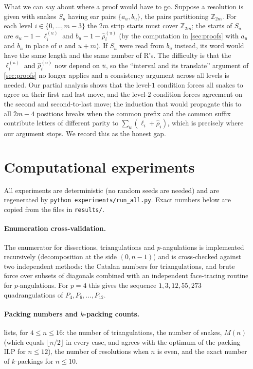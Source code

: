 \documentclass[11pt,a4paper]{article}
\theoremstyle{definition}
\theoremstyle{remark}
\newcommand{\Zd}{\ensuremath{\mathbb{Z}}}
\newcommand{\Ri}{\mathrm{R}}
\begin{document}
What we can say about where a proof would have to go.  Suppose a resolution is given with
snakes $S_u$ having ear pairs $\{a_u,b_u\}$, the pairs partitioning $\Zd_{2m}$.  For each
level $i\in\{0,\dots,m-3\}$ the $2m$ strip starts must cover $\Zd_{2m}$; the starts of
$S_u$ are $a_u-1-\ell^{(u)}_i$ and $b_u-1-\hat\rho^{(u)}_i$ (by the computation in
\cref{sec:proofs} with $a_u$ and $b_u$ in place of $u$ and $u+m$).  If $S_u$ were read from
$b_u$ instead, its word would have the same length and the same number of $\Ri$'s.  The
difficulty is that the $\ell^{(u)}_i$ and $\hat\rho^{(u)}_i$ now depend on $u$, so the
``interval and its translate'' argument of \cref{sec:proofs} no longer applies and a
consistency argument across all levels is needed.  Our partial analysis shows that the
level-$1$ condition forces all snakes to agree on their first and last move, and the
level-$2$ condition forces agreement on the second and second-to-last move; the induction
that would propagate this to all $2m-4$ positions breaks when the common prefix and the
common suffix contribute letters of different parity to $\sum_u(\ell_i+\hat\rho_i)$, which
is precisely where our argument stops.  We record this as the honest gap.

\section{Computational experiments}\label{sec:experiments}

All experiments are deterministic (no random seeds are needed) and are regenerated by
\texttt{python experiments/run\_all.py}.  Exact numbers below are copied from the files in
\texttt{results/}.

\paragraph{Enumeration cross-validation.}  The enumerator for dissections, triangulations
and $p$-angulations is implemented recursively (decomposition at the side $(0,n-1)$) and is
cross-checked against two independent methods: the Catalan numbers for triangulations, and
brute force over subsets of diagonals combined with an independent face-tracing routine for
$p$-angulations.  For $p=4$ this gives the sequence $1,3,12,55,273$ quadrangulations of
$P_4,P_6,\dots,P_{12}$.

\paragraph{Packing numbers and $k$-packing counts.}
 lists, for $4\le n\le16$: the number of triangulations, the number of
snakes, $M(n)$ (which equals $\lfloor n/2\rfloor$ in every case, and agrees with the
optimum of the packing ILP for $n\le12$), the number of resolutions when $n$ is even, and
the exact number of $k$-packings for $n\le10$.
\end{document}
